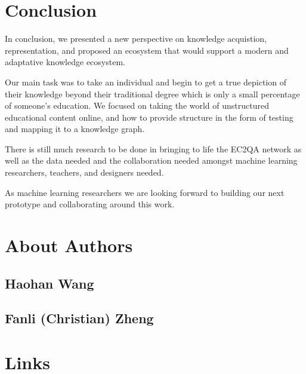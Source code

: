 \documentclass[]{book}
\theoremstyle{definition}
\theoremstyle{definition}
\theoremstyle{definition}
\theoremstyle{remark}
\begin{document}
\chapter{Conclusion}\label{conclusion}

In conclusion, we presented a new perspective on knowledge acquistion,
representation, and proposed an ecosystem that would support a modern
and adaptative knowledge ecosystem.

Our main task was to take an individual and begin to get a true
depiction of their knowledge beyond their traditional degree which is
only a small percentage of someone's education. We focused on taking the
world of unstructured educational content online, and how to provide
structure in the form of testing and mapping it to a knowledge graph.

There is still much research to be done in bringing to life the EC2QA
network as well as the data needed and the collaboration needed amongst
machine learning researchers, teachers, and designers needed.

As machine learning researchers we are looking forward to building our
next prototype and collaborating around this work.

\chapter{About Authors}\label{about-authors}

\section{Haohan Wang}\label{haohan-wang}

\section{Fanli (Christian) Zheng}\label{fanli-christian-zheng}

\chapter{Links}\label{links}


\end{document}
